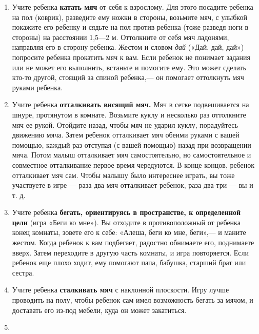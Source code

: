 \documentclass{book}
\renewcommand{\emph}[1]{\textit{#1}}
\begin{document}
\begin{enumerate}
\def\labelenumi{\arabic{enumi}.}
\item
  
  Учите ребенка \textbf{катать мяч} от себя к взрослому. Для этого
  посадите ребенка на пол (коврик), разведите ему ножки в стороны,
  возьмите мяч, с улыбкой покажите его ребенку и сядьте на пол против
  ребенка (тоже разведя ноги в стороны) на расстоянии 1,5---2 м.
  Оттолкните от себя мяч ладонями, направляя его в сторону ребенка.
  Жестом и словом \emph{дай} («Дай, дай, дай») попросите ребенка
  прокатить мяч к вам. Если ребенок не понимает задания или не может его
  выполнить, встаньте и помогите ему. Это может сделать кто-то другой,
  стоящий за спиной ребенка,--- он помогает оттолкнуть мяч руками
  ребенка.
  
\item
  
  Учите ребенка \textbf{отталкивать висящий мяч.} Мяч в сетке
  подвешивается на шнуре, протянутом в комнате. Возьмите куклу и
  несколько раз оттолкните мяч ее рукой. Отойдите назад, чтобы мяч не
  ударил куклу, порадуйтесь движению мяча. Затем ребенок отталкивает мяч
  обеими руками с вашей помощью, каждый раз отступая (с вашей помощью)
  назад при возвращении мяча. Потом малыш отталкивает мяч
  самостоятельно, но самостоятельное и совместное отталкивание первое
  время чередуются. В конце концов, ребенок отталкивает мяч сам. Чтобы
  малышу было интереснее играть, вы тоже участвуете в игре --- раза два
  мяч отталкивает ребенок, раза два-три --- вы и т. д.

\item
  
  Учите ребенка \textbf{бегать, ориентируясь в пространстве, к
  определенной цели} (игра «Беги ко мне»). Вы отходите в противоположный
  от ребенка конец комнаты, зовете его к себе: «Алеша, беги ко мне,
  беги»,--- и маните жестом. Когда ребенок к вам подбегает, радостно
  обнимаете его, поднимаете вверх. Затем переходите в другую часть
  комнаты, и игра повторяется. Если ребенок еще плохо ходит, ему
  помогают папа, бабушка, старший брат или сестра.
  
\item
  
  Учите ребенка \textbf{сталкивать мяч} с наклонной плоскости. Игру
  лучше проводить на полу, чтобы ребенок сам имел возможность бегать за
  мячом, и доставать его из-под мебели, куда он может закатиться.
  
\item
  

\end{enumerate}
\end{document}
